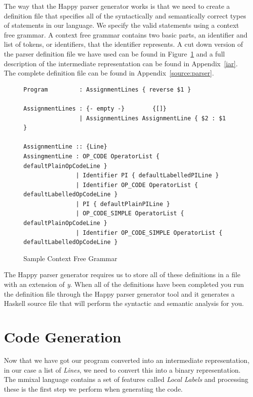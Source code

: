 \documentclass[a4paper,11pt]{report}
\begin{document}
The way that the Happy parser generator works is that we need to create a definition file that specifies all of the syntactically and semantically correct types of statements in our language. We specify the valid statements using a context free grammar. A context free grammar contains two basic parts, an identifier and list of tokens, or identifiers, that the identifier represents. A cut down version of the parser definition file we have used can be found in Figure~\ref{cfg:happy} and a full description of the intermediate representation can be found in Appendix~\ref{iar}. 
The complete definition file can be found in Appendix~\ref{source:parser}.

\begin{figure}[ht!]
\centering
\begin{lstlisting}[basicstyle=\ttfamily\tiny]
Program         : AssignmentLines { reverse $1 }

AssignmentLines : {- empty -}        {[]}
                | AssignmentLines AssignmentLine { $2 : $1 }

AssignmentLine :: {Line}
AssingmentLine : OP_CODE OperatorList { defaultPlainOpCodeLine }
               | Identifier PI { defaultLabelledPILine }
               | Identifier OP_CODE OperatorList { defaultLabelledOpCodeLine }
               | PI { defaultPlainPILine }
               | OP_CODE_SIMPLE OperatorList { defaultPlainOpCodeLine }
               | Identifier OP_CODE_SIMPLE OperatorList { defaultLabelledOpCodeLine }
\end{lstlisting}
\caption{Sample Context Free Grammar}
\label{cfg:happy}
\end{figure}

The Happy parser generator requires us to store all of these definitions in a file with an extension of \textit{y}. When all of the definitions have been completed you run the definition file through the Happy parser generator tool and it generates a Haskell source file that will perform the syntactic and semantic analysis for you.

\section{Code Generation}
Now that we have got our program converted into an intermediate representation, in our case a list of \textit{Lines}, we need to convert this into a binary representation. The mmixal language contains a set of features called \textit{Local Labels} and processing these is the first step we perform when generating the code.
\end{document}

